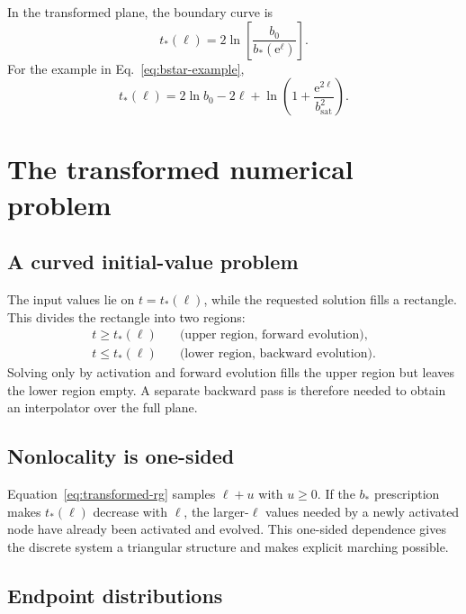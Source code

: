 \documentclass[11pt]{article}
\newcommand{\ee}{\mathrm{e}}
\newcommand{\bzero}{b_0}
\begin{document}
In the transformed plane, the boundary curve is
\begin{equation}
  t_*(\ell)
  =
  2\ln\left[\frac{\bzero}{b_*(\ee^\ell)}\right].
  \label{eq:general-boundary-curve}
\end{equation}
For the example in Eq.~\eqref{eq:bstar-example},
\begin{equation}
  t_*(\ell)
  =
  2\ln\bzero-2\ell
  +\ln\left(1+\frac{\ee^{2\ell}}{b_{\mathrm{sat}}^2}\right).
  \label{eq:example-boundary-curve}
\end{equation}

\pagebreak
\section{The transformed numerical problem}

\subsection{A curved initial-value problem}

The input values lie on \(t=t_*(\ell)\), while the requested solution fills a
rectangle. This divides the rectangle into two regions:
\begin{align}
  t\ge t_*(\ell)
  &\quad\text{(upper region, forward evolution)},\\
  t\le t_*(\ell)
  &\quad\text{(lower region, backward evolution)}.
\end{align}
Solving only by activation and forward evolution fills the upper region but
leaves the lower region empty. A separate backward pass is therefore needed
to obtain an interpolator over the full plane.

\subsection{Nonlocality is one-sided}

Equation~\eqref{eq:transformed-rg} samples \(\ell+u\) with \(u\ge0\).
If the \(b_*\) prescription makes \(t_*(\ell)\) decrease with \(\ell\), the
larger-\(\ell\) values needed by a newly activated node have already been
activated and evolved. This one-sided dependence gives the discrete system a
triangular structure and makes explicit marching possible.

\subsection{Endpoint distributions}
\end{document}

